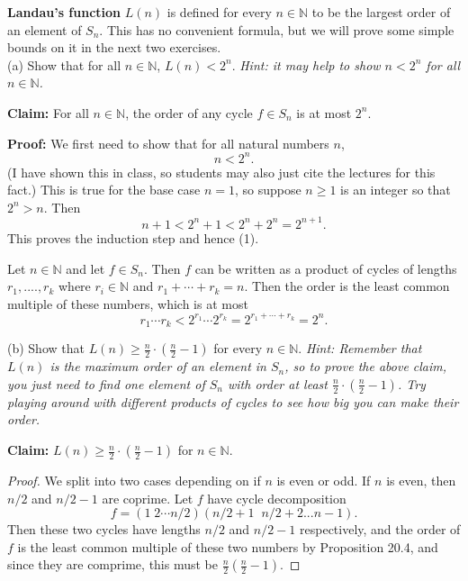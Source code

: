 \documentclass[11pt,dvipsnames]{book}
\numberwithin{figure}{section} %
\numberwithin{table}{section} %
\begin{document}
 
\begin{exercise}
{\bf Landau's function} $L(n)$ is defined for every $n\in\mathbb{N}$ to be the largest order of an element of $S_{n}$. This has no convenient formula, but we will prove some simple bounds on it in the next two exercises. \\

(a) Show that  for all $n\in\mathbb{N}$, $L(n)<2^{n}$. {\it Hint: it may help to show $n<2^{n}$ for all $n\in\mathbb{N}$.}

\begin{solution}
{\bf Claim:}
For all $n\in \mathbb{N}$, the order of any cycle $f\in S_{n}$ is at most $2^{n}$. 

{\bf Proof:}
We first need to show that for all natural numbers $n$,
\begin{equation}
\label{e:n<2^n}
n<2^{n}.
\end{equation}
(I have shown this in class, so students may also just cite the lectures for this fact.) This is true for the base case $n=1$, so suppose $n\geq 1$ is an integer so that $2^{n}>n$. Then
\[
n+1<2^{n}+1<2^{n}+2^{n}=2^{n+1}. 
\]
This proves the induction step and hence (1).

Let $n\in\mathbb{N}$ and let $f\in S_{n}$. Then $f$ can be written as a product of cycles of lengths $r_{1},....,r_{k}$ where $r_{i}\in \mathbb{N}$ and $r_{1}+\cdots  + r_{k}=n$. Then the order is the least common multiple of these numbers, which is at most 
\[
r_{1}\cdots r_{k}<2^{r_{1}}\cdots 2^{r_{k}}=2^{r_{1}+\cdots + r_{k}}=2^{n}.
\]
\end{solution}

(b)  Show that $L(n)\geq\frac{n}{2}\cdot \left(\frac{n}{2}-1\right)$ for every $n\in \mathbb{N}$.  {\it Hint: Remember that $L(n)$ is the maximum order of an element in $S_{n}$, so to prove the above claim, you just need to find one element of $S_{n}$ with order at least $\frac{n}{2}\cdot \left(\frac{n}{2}-1\right)$. Try playing around with different products of cycles to see how big you can make their order.}



\begin{solution}
{\bf Claim:}
$L(n)\geq\frac{n}{2}\cdot \left(\frac{n}{2}-1\right)$ for $n\in \mathbb{N}$.

\begin{proof}
We split into two cases depending on if $n$ is even or odd. If $n$ is even, then $n/2$ and $n/2-1$ are coprime. Let $f$ have cycle decomposition 
\[
f=(1\; 2\cdots n/2)(n/2+1 \;\; n/2+2...n-1).
\]
Then these two cycles have lengths $n/2$ and $n/2-1$ respectively, and the order of $f$ is the least common multiple of these two numbers by Proposition 20.4, and since they are comprime, this must be $\frac{n}{2}\left(\frac{n}{2}-1\right)$. 


\end{proof}
\end{solution}
\end{exercise}
\end{document}
